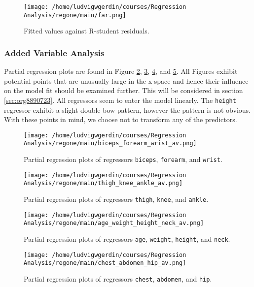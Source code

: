 \documentclass[11pt]{article}
\begin{document}
\begin{figure}[htbp]
\centering
\texttt{[image: /home/ludvigwgerdin/courses/Regression Analysis/regone/main/far.png]}
\caption{\label{fig:orgea82150}
Fitted values against R-student residuals.}
\end{figure}

\subsubsection{Added Variable Analysis}
\label{sec:org5787996}

Partial regression plots are found in Figure \ref{fig:orgba8291f}, \ref{fig:org7ab61d3},
\ref{fig:org2c43726}, and \ref{fig:org155ecce}. All Figures exhibit potential points 
that are unusually large in the x-space and hence their influence on the model fit should be 
examined further. This will be considered in section \ref{sec:org8890723}. All regressors
seem to enter the model linearly. The \texttt{height} regressor exhibit a slight double-bow pattern, however
the pattern is not obvious. With these points in mind, we choose not to transform any of the 
predictors.

\begin{figure}[htbp]
\centering
\texttt{[image: /home/ludvigwgerdin/courses/Regression Analysis/regone/main/biceps\_forearm\_wrist\_av.png]}
\caption{\label{fig:orgba8291f}
Partial regression plots of regressors \texttt{biceps}, \texttt{forearm}, and \texttt{wrist}.}
\end{figure}   

\begin{figure}[htbp]
\centering
\texttt{[image: /home/ludvigwgerdin/courses/Regression Analysis/regone/main/thigh\_knee\_ankle\_av.png]}
\caption{\label{fig:org7ab61d3}
Partial regression plots of regressors \texttt{thigh}, \texttt{knee}, and \texttt{ankle}.}
\end{figure}

\begin{figure}[htbp]
\centering
\texttt{[image: /home/ludvigwgerdin/courses/Regression Analysis/regone/main/age\_weight\_height\_neck\_av.png]}
\caption{\label{fig:org2c43726}
Partial regression plots of regressors \texttt{age}, \texttt{weight}, \texttt{height}, and \texttt{neck}.}
\end{figure}

\begin{figure}[htbp]
\centering
\texttt{[image: /home/ludvigwgerdin/courses/Regression Analysis/regone/main/chest\_abdomen\_hip\_av.png]}
\caption{\label{fig:org155ecce}
Partial regression plots of regressors \texttt{chest}, \texttt{abdomen}, and \texttt{hip}.}
\end{figure}
\end{document}
